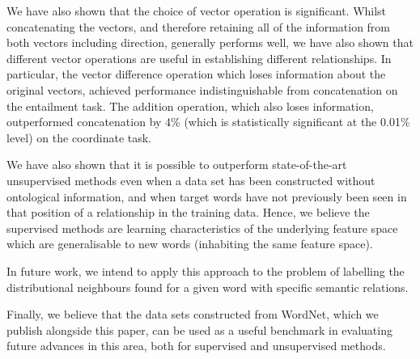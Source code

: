 \documentclass[11pt]{article}
\begin{document}
We have also shown that the choice of vector operation is significant.  Whilst concatenating the vectors, and therefore retaining all of the information from both vectors including direction, generally performs well, we have also shown that different vector operations are useful in establishing different relationships.  In particular, the vector difference operation which loses information about the original vectors, achieved performance indistinguishable from concatenation on the entailment task.  The addition operation, which also loses information, outperformed concatenation by 4\% (which is statistically significant at the 0.01\% level) on the coordinate task.

We have also shown that it is possible to outperform  state-of-the-art unsupervised methods even when a data set has been constructed without  ontological information, and when target words have not previously been seen in that position of a relationship in the training data.  Hence, we believe the supervised methods are learning characteristics of the underlying feature space which are generalisable to new words (inhabiting the same feature space).  

In future work, we intend to apply this approach to the problem of labelling the distributional neighbours found for a given word
 with specific semantic relations.

Finally, we believe that the data sets constructed from WordNet, which we publish alongside this paper,  can be used as a useful benchmark in evaluating future advances in this area, both for supervised and unsupervised methods.

\newpage



\end{document}
